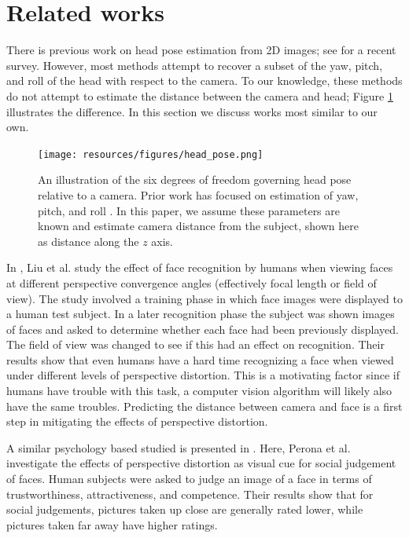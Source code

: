 \documentclass[runningheads]{llncs}
\begin{document}
\section{Related works} \label{sec:related}
There is previous work on head pose estimation from 2D images; see \cite{murphy2009head} for a recent survey.
However, most methods attempt to recover a subset of the yaw, pitch, and roll of the head with respect to the camera.
To our knowledge, these methods do not attempt to estimate the distance between the camera and head; Figure \ref{fig:head_pose} illustrates the difference.
In this section we discuss works most similar to our own.

\begin{figure}[ht]
\centering
\texttt{[image: resources/figures/head\_pose.png]}
\caption{
An illustration of the six degrees of freedom governing head pose relative to a camera.
Prior work has focused on estimation of yaw, pitch, and roll \cite{murphy2009head}.
In this paper, we assume these parameters are known and estimate camera distance from the subject, shown here as distance along the $z$ axis.
}
\label{fig:head_pose}
\end{figure}

In \cite{liu2003face,liu2006face}, Liu et al. study the effect of face recognition by humans when viewing faces at different perspective convergence angles (effectively focal length or field of view). 
The study involved a training phase in which face images were displayed to a human test subject.
In a later recognition phase the subject was shown images of faces and asked to determine whether each face had been previously displayed.
The field of view was changed to see if this had an effect on recognition. 
Their results show that even humans have a hard time recognizing a face when viewed under different levels of perspective distortion.  
This is a motivating factor since if humans have trouble with this task, a computer vision algorithm will likely also have the same troubles.  
Predicting the distance between camera and face is a first step in mitigating the effects of perspective distortion.

A similar psychology based studied is presented in \cite{perona2007new,bryan2012perspective}. 
Here, Perona et al. investigate the effects of perspective distortion as visual cue for social judgement of faces.  
Human subjects were asked to judge an image of a face in terms of trustworthiness, attractiveness, and competence.  
Their results show that for social judgements, pictures taken up close are generally rated lower, while pictures taken far away have higher ratings.
\end{document}

